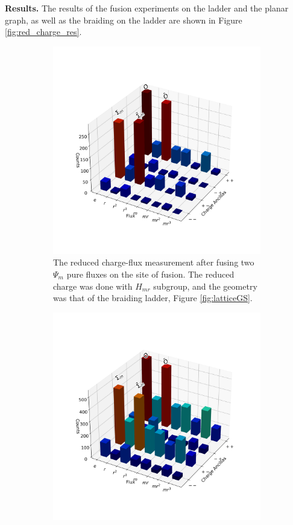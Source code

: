 \documentclass[two column]{article}
\begin{document}
\textbf{Results.}
The results of the fusion experiments on the ladder and the planar graph, as well as the braiding on the ladder are shown in Figure \ref{fig:red_charge_res}.
\begin{figure}
\centering
\begin{subfigure}{0.47\textwidth}
    \includegraphics[width = \linewidth]{Figures/fusion_on_glasses.png}
    \caption{The reduced charge-flux measurement after fusing two $\Psi_m$ pure fluxes on the site of fusion. The reduced charge was done with $H_{mr}$ subgroup, and the geometry was that of the braiding ladder, Figure \ref{fig:latticeGS}.}
    \label{fig:fusion_glass}
\end{subfigure}\hfill
\begin{subfigure}{0.47\textwidth}
    \includegraphics[width=\linewidth]{Figures/fusion_on_basketball.png}

\end{subfigure}
\end{figure}
\end{document}
